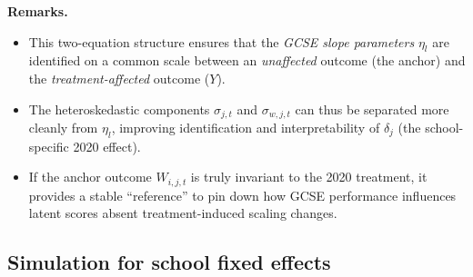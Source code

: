 \bigskip
\noindent
\textbf{Remarks.}
\begin{itemize}
    \item This two-equation structure ensures that the \emph{GCSE slope parameters} $\eta_l$ are identified on a common scale between an \emph{unaffected} outcome (the anchor) and the \emph{treatment-affected} outcome ($Y$). 
    \item The heteroskedastic components $\sigma_{j,t}$ and $\sigma_{w,j,t}$ can thus be separated more cleanly from $\eta_l$, improving identification and interpretability of $\delta_j$ (the school-specific 2020 effect).
    \item If the anchor outcome $W_{i,j,t}$ is truly invariant to the 2020 treatment, it provides a stable “reference” to pin down how GCSE performance influences latent scores absent treatment-induced scaling changes.
\end{itemize}

\subsection{Simulation for school fixed effects}
